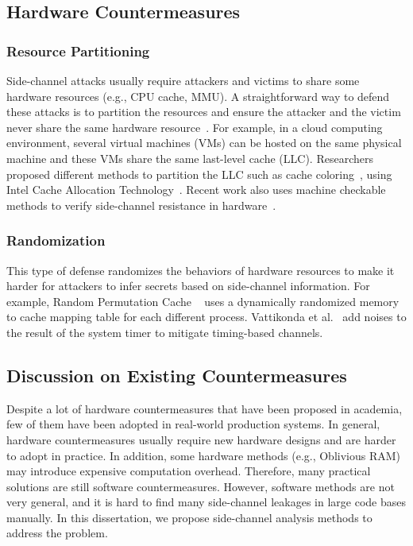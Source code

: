 \subsection{Hardware Countermeasures}
\subsubsection*{Resource Partitioning}
Side-channel attacks usually require attackers and victims to share some hardware resources (e.g., CPU cache, MMU). A straightforward way to defend these attacks is to partition the resources and ensure the attacker and the victim never share the same hardware resource~\cite{Page2005PartitionedCA,shi2011limiting,liu2016catalyst}. For example, in a cloud computing environment, several virtual machines (VMs) can be hosted on the same physical machine and these VMs share the same last-level cache (LLC). Researchers proposed different methods to partition the LLC such as cache coloring~\cite{shi2011limiting}, using Intel Cache Allocation Technology~\cite{liu2016catalyst}. Recent work also uses machine checkable methods to verify side-channel resistance in hardware~\cite{Zhang:2015:HDL:2775054.2694372,Li:2014:SLH:2541940.2541947,236334}.
\subsubsection*{Randomization}
This type of defense randomizes the behaviors of hardware resources to make it harder for attackers to infer secrets based on side-channel information. For example, Random Permutation Cache ~\cite{wang2007new} uses a dynamically randomized memory to cache mapping table for each different process. Vattikonda et al.~\cite{vattikonda2011eliminating} add noises to the result of the system timer to mitigate timing-based channels.

\subsection{Discussion on Existing Countermeasures}
Despite a lot of hardware countermeasures that have been proposed in academia, few of them have been adopted in real-world production systems. In general, hardware countermeasures usually require new hardware designs and are harder to adopt in practice.  In addition, some hardware methods (e.g., Oblivious RAM) may introduce expensive computation overhead. Therefore, many practical solutions are still software countermeasures. However, software methods are not very general, and it is hard to find many side-channel leakages in large code bases manually. In this dissertation, we propose side-channel analysis methods to address the problem.

